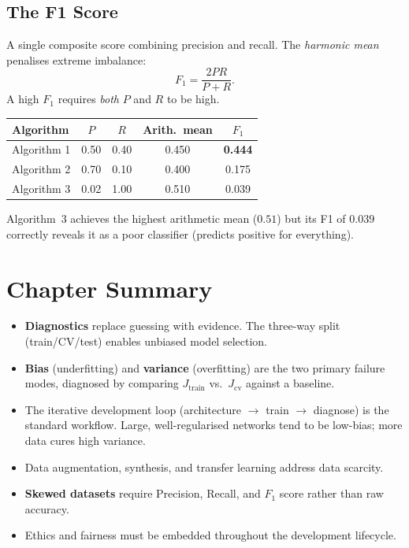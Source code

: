 \subsection{The F1 Score}

A single composite score combining precision and recall. The \emph{harmonic
mean} penalises extreme imbalance:
\begin{equation}
F_1=\frac{2PR}{P+R}.
\label{eq:f1}
\end{equation}
A high $F_1$ requires \emph{both} $P$ and $R$ to be high.

\begin{center}
\begin{tabular}{lcccc}
\toprule
\textbf{Algorithm} & $P$ & $R$ & \textbf{Arith.\ mean} & $F_1$\\
\midrule
Algorithm 1 & 0.50 & 0.40 & 0.450 & \textbf{0.444}\\
Algorithm 2 & 0.70 & 0.10 & 0.400 & 0.175\\
Algorithm 3 & 0.02 & 1.00 & 0.510 & 0.039\\
\bottomrule
\end{tabular}
\end{center}

Algorithm~3 achieves the highest arithmetic mean ($0.51$) but its F1 of $0.039$
correctly reveals it as a poor classifier (predicts positive for everything).

\section*{Chapter Summary}

\begin{itemize}
\item \textbf{Diagnostics} replace guessing with evidence. The three-way
  split (train/CV/test) enables unbiased model selection.
\item \textbf{Bias} (underfitting) and \textbf{variance} (overfitting) are the
  two primary failure modes, diagnosed by comparing $J_{\text{train}}$ vs.\
  $J_{\text{cv}}$ against a baseline.
\item The iterative development loop (architecture $\to$ train $\to$ diagnose)
  is the standard workflow. Large, well-regularised networks tend to be
  low-bias; more data cures high variance.
\item Data augmentation, synthesis, and transfer learning address data scarcity.
\item \textbf{Skewed datasets} require Precision, Recall, and $F_1$ score
  rather than raw accuracy.
\item Ethics and fairness must be embedded throughout the development lifecycle.
\end{itemize}
